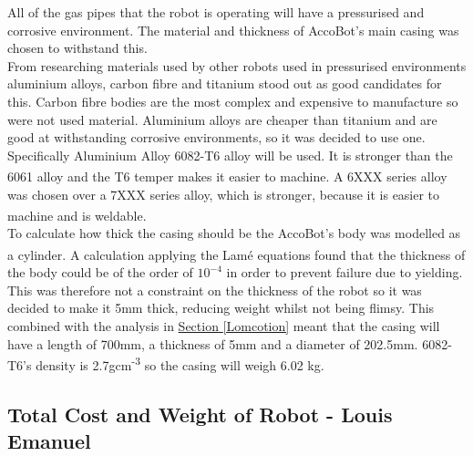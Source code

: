 \documentclass[11pt]{article}		%
\newcommand{\supercite}[1]{\textsuperscript{\cite{#1}}}		%
\newcommand{\sectref}[1]{\hyperref[#1]{Section \ref*{#1}}}     %
\begin{document}
			All of the gas pipes that the robot is operating will have a pressurised and corrosive environment. %
			The material and thickness of AccoBot's main casing was chosen to withstand this.%
			\\
            \hspace*{2ex}From researching materials used by other robots used in pressurised environments aluminium alloys, carbon fibre and titanium stood out as good candidates for this. Carbon fibre bodies are the most complex and expensive to manufacture so were not used material. Aluminium alloys are cheaper than titanium and are good at withstanding corrosive environments, so it was decided to use one.
		    Specifically Aluminium Alloy 6082-T6 alloy will be used. It is stronger than the 6061 alloy and the T6 temper makes it easier to machine\supercite{Aluminium_Alloys}. A 6XXX series alloy was chosen over a 7XXX series alloy, which is stronger, because it is easier to machine and is weldable\supercite{Aluminium_Alloys_differences}.
		    \\
            \hspace*{2ex}To calculate how thick the casing should be the AccoBot's body was modelled as a cylinder. A calculation applying the Lamé equations\supercite{lame} found that the thickness of the body could be of the order of $10^{-4}$ in order to prevent failure due to yielding. This was therefore not a constraint on the thickness of the robot so it was decided to make it 5mm thick, reducing weight whilst not being flimsy. This combined with the analysis in \sectref{Lomcotion} meant that the casing will have a length of 700mm, a thickness of 5mm and a diameter of 202.5mm.  6082-T6's density is 2.7gcm\textsuperscript{-3} so the casing will weigh 6.02 kg.
		   
   		\subsection[Total Cost and Weight of Robot]{Total Cost and Weight of Robot - Louis Emanuel}
   		
\end{document}
